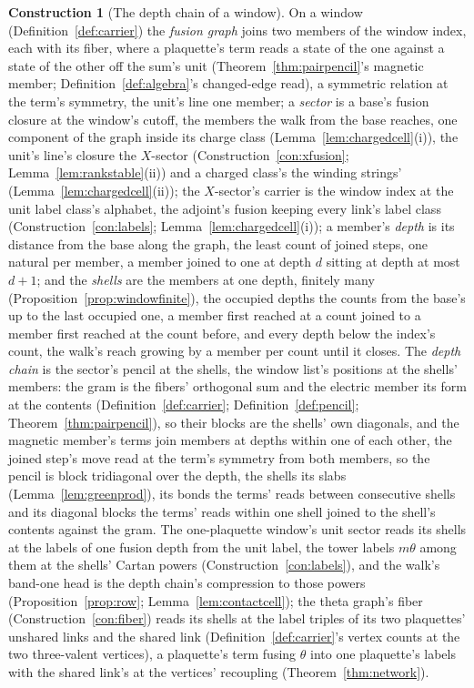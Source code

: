 \documentclass[11pt]{article}
\theoremstyle{definition}
\newtheorem{construction}{Construction}
\begin{document}
\begin{construction}[The depth chain of a window]\label{con:depthchain}
On a window (Definition~\ref{def:carrier}) the \emph{fusion graph}
joins two members of the window index, each with its fiber, where
a plaquette's term reads a state of the one against a state of the
other off the sum's unit (Theorem~\ref{thm:pairpencil}'s magnetic
member; Definition~\ref{def:algebra}'s changed-edge read), a
symmetric relation at the term's symmetry, the unit's line one
member; a \emph{sector} is a base's fusion closure at the window's
cutoff, the members the walk from the base reaches, one component
of the graph inside its charge class
(Lemma~\ref{lem:chargedcell}(i)), the unit's line's closure the
$X$-sector (Construction~\ref{con:xfusion};
Lemma~\ref{lem:rankstable}(ii)) and a charged class's the winding
strings' (Lemma~\ref{lem:chargedcell}(ii)); the $X$-sector's
carrier is the window index at the unit label class's alphabet,
the adjoint's fusion keeping every link's label class
(Construction~\ref{con:labels}; Lemma~\ref{lem:chargedcell}(i)); a
member's \emph{depth} is its distance from the base along the
graph, the least count of joined steps, one natural per member, a
member joined to one at depth $d$ sitting at depth at most $d+1$;
and the \emph{shells} are the members at one depth, finitely many
(Proposition~\ref{prop:windowfinite}), the occupied depths the
counts from the base's up to the last occupied one, a member first
reached at a count joined to a member first reached at the count
before, and every depth below the index's count, the walk's reach
growing by a member per count until it closes. The
\emph{depth chain} is the sector's pencil at the shells, the
window list's positions at the shells' members: the gram is the
fibers' orthogonal sum and the electric member its form at the
contents (Definition~\ref{def:carrier}; Definition~\ref{def:pencil};
Theorem~\ref{thm:pairpencil}), so their blocks are the shells' own
diagonals, and the magnetic member's terms join members at depths
within one of each other, the joined step's move read at the
term's symmetry from both members, so the pencil is block
tridiagonal over the depth, the shells its slabs
(Lemma~\ref{lem:greenprod}), its bonds the terms' reads between
consecutive shells and its diagonal blocks the terms' reads within
one shell joined to the shell's contents against the gram. The
one-plaquette window's
unit sector reads its shells at the labels of one fusion depth from
the unit label, the tower labels $m\theta$ among them at the
shells' Cartan powers (Construction~\ref{con:labels}), and the walk's
band-one head is the depth chain's compression to those powers
(Proposition~\ref{prop:row}; Lemma~\ref{lem:contactcell}); the
theta graph's fiber (Construction~\ref{con:fiber}) reads its shells
at the label triples of its two plaquettes' unshared links and the
shared link (Definition~\ref{def:carrier}'s vertex counts at the
two three-valent vertices), a plaquette's term fusing $\theta$ into
one plaquette's labels with the shared link's at the vertices'
recoupling (Theorem~\ref{thm:network}).
\end{construction}
\end{document}

